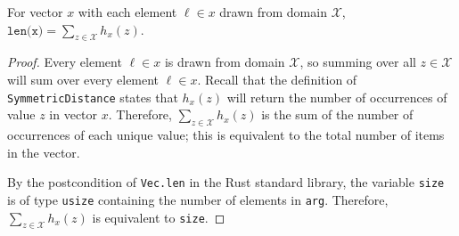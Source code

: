 \documentclass{article}
\begin{document}
\begin{lemma} 
    \label{lemma:len-sum-equiv} 
    For vector $x$ with each element $\ell\in x$ drawn from domain $\mathcal{X}$, $\texttt{len(x)} = \sum_{z\in\mathcal{X}} h_x(z)$. 
\end{lemma} 
 
\begin{proof} 
    Every element $\ell \in x$ is drawn from domain $\mathcal{X}$, so summing over all $z\in \mathcal{X}$ will sum over every element $\ell\in x$.  
    Recall that the definition of \texttt{SymmetricDistance} states that $h_x(z)$ will return the number of occurrences of value $z$ in vector $x$. 
    Therefore, $\sum_{z\in\mathcal{X}} h_x(z)$ is the sum of the number of occurrences of each unique value;  
    this is equivalent to the total number of items in the vector.  
 
    By the postcondition of \texttt{Vec.len} in the Rust standard library, 
    the variable \texttt{size} is of type \texttt{usize} containing the number of elements in \texttt{arg}. 
    Therefore, $\sum_{z\in\mathcal{X}} h_x(z)$ is equivalent to \texttt{size}. 
\end{proof} 
 
\end{document}
